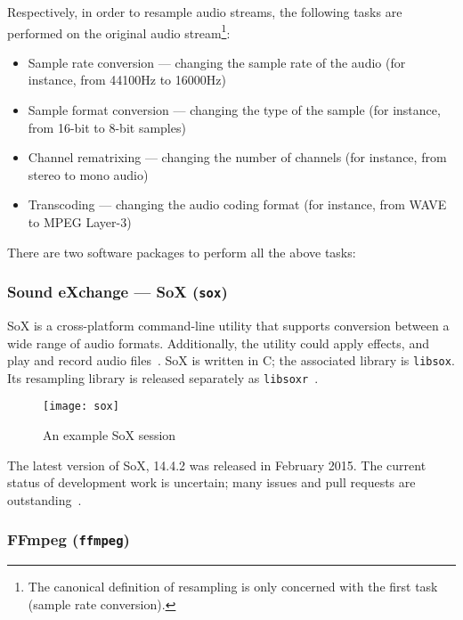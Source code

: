 Respectively, in order to resample audio streams, the following tasks
are performed on the original audio stream\footnote{The canonical
definition of resampling is only concerned with the first task
(sample rate conversion).}:

\begin{itemize}
    \item Sample rate conversion --- changing the sample rate of the audio
    (for instance, from 44100Hz to 16000Hz)
    \item Sample format conversion --- changing the type of the sample
    (for instance, from 16-bit to 8-bit samples)
    \item Channel rematrixing --- changing the number of channels
    (for instance, from stereo to mono audio)
    \item Transcoding --- changing the audio coding format (for instance,
    from WAVE to MPEG Layer-3)
\end{itemize}

There are two software packages to perform all the above tasks:

\subsubsection{Sound eXchange --- SoX (\texttt{sox})}

SoX is a cross-platform command-line utility that supports conversion
between a wide range of audio formats. Additionally, the utility could
apply effects, and play and record audio files~\cite{sox-docs}.
SoX is written in C\@; the associated library is \texttt{libsox}. Its
resampling library is released separately as
\texttt{libsoxr}~\cite{sox}.

\begin{figure}[h]
\begin{center}
    \texttt{[image: sox]}
    \caption{An example SoX session~\cite{sox}}
\end{center}
\end{figure}

The latest version of SoX, 14.4.2 was released in February 2015. The
current status of development work is uncertain; many issues and pull
requests are outstanding~\cite{sox-cl}.

\subsubsection{FFmpeg (\texttt{ffmpeg})}


